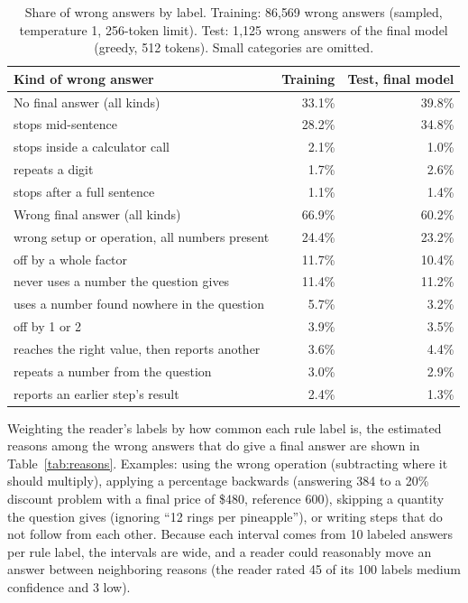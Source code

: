 \documentclass[10pt]{article}
\begin{document}
\begin{table}[h]
\centering
\small
\begin{tabular}{lrr}
\toprule
Kind of wrong answer & Training & Test, final model \\
\midrule
No final answer (all kinds) & 33.1\% & 39.8\% \\
\quad stops mid-sentence & 28.2\% & 34.8\% \\
\quad stops inside a calculator call & 2.1\% & 1.0\% \\
\quad repeats a digit & 1.7\% & 2.6\% \\
\quad stops after a full sentence & 1.1\% & 1.4\% \\
Wrong final answer (all kinds) & 66.9\% & 60.2\% \\
\quad wrong setup or operation, all numbers present & 24.4\% & 23.2\% \\
\quad off by a whole factor & 11.7\% & 10.4\% \\
\quad never uses a number the question gives & 11.4\% & 11.2\% \\
\quad uses a number found nowhere in the question & 5.7\% & 3.2\% \\
\quad off by 1 or 2 & 3.9\% & 3.5\% \\
\quad reaches the right value, then reports another & 3.6\% & 4.4\% \\
\quad repeats a number from the question & 3.0\% & 2.9\% \\
\quad reports an earlier step's result & 2.4\% & 1.3\% \\
\bottomrule
\end{tabular}
\caption{Share of wrong answers by label. Training: 86{,}569 wrong answers (sampled, temperature 1, 256-token limit). Test: 1{,}125 wrong answers of the final model (greedy, 512 tokens). Small categories are omitted.}
\label{tab:fail}
\end{table}

Weighting the reader's labels by how common each rule label is, the estimated reasons among the wrong answers that do give a final answer are shown in Table~\ref{tab:reasons}. Examples: using the wrong operation (subtracting where it should multiply), applying a percentage backwards (answering 384 to a 20\% discount problem with a final price of \$480, reference 600), skipping a quantity the question gives (ignoring ``12 rings per pineapple''), or writing steps that do not follow from each other. Because each interval comes from 10 labeled answers per rule label, the intervals are wide, and a reader could reasonably move an answer between neighboring reasons (the reader rated 45 of its 100 labels medium confidence and 3 low).
\end{document}
